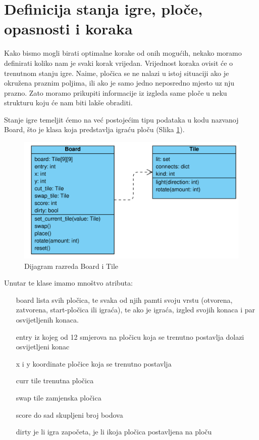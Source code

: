 \documentclass[zavrsnirad]{fer}
\begin{document}
\section{Definicija stanja igre, ploče, opasnosti i koraka}
\label{pog:definicija_stanja}

Kako bismo mogli birati optimalne korake od onih mogućih, nekako moramo definirati koliko nam je svaki korak vrijedan. Vrijednost koraka ovisit će o trenutnom stanju igre. Naime, pločica se ne nalazi u istoj situaciji ako je okružena praznim poljima, ili ako je samo jedno neposredno mjesto uz nju prazno. Zato moramo prikupiti informacije iz izgleda same ploče u neku strukturu koju će nam biti lakše obraditi.

Stanje igre temeljit ćemo na već postojećim tipu podataka u kodu nazvanoj Board, što je klasa koja predstavlja igraću ploču (Slika \ref{slk:class_diagram}).

\begin{figure}[htb]
	\centering
	\includegraphics[width=0.68\linewidth]{Figures/board_diagram.png} 
	\caption{Dijagram razreda Board i Tile}
	\label{slk:class_diagram}
\end{figure}

Unutar te klase imamo mnoštvo atributa:
\begin{itemize}
	\item[board] lista svih pločica, te svaka od njih pamti svoju vrstu (otvorena, zatvorena, start-pločica ili igraća), te ako je igraća, izgled svojih konaca i par osvijetljenih konaca.
	\item[entry] iz kojeg od 12 smjerova na pločicu koja se trenutno postavlja dolazi osvijetljeni konac
	\item[x i y] koordinate pločice koja se trenutno postavlja
	\item[curr tile] trenutna pločica
	\item[swap tile] zamjenska pločica
	\item[score] do sad skupljeni broj bodova
	\item[dirty] je li igra započeta, je li ikoja pločica postavljena na ploču
\end{itemize}
\end{document}
